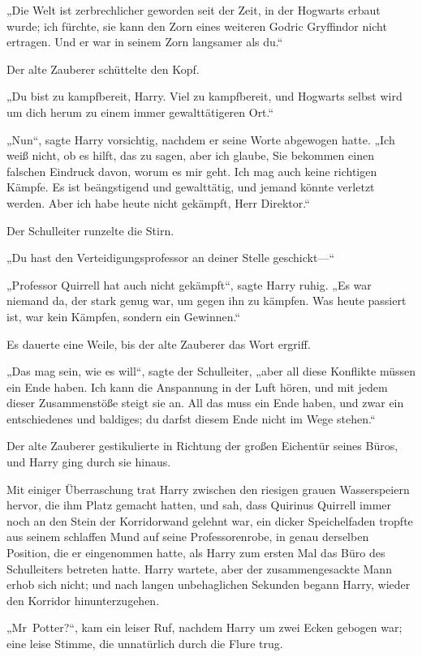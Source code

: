 {„Die Welt ist zerbrechlicher geworden seit der Zeit, in der Hogwarts erbaut wurde; ich fürchte, sie kann den Zorn eines weiteren Godric Gryffindor nicht ertragen. Und er war in seinem Zorn langsamer als du.“

Der alte Zauberer schüttelte den Kopf.

„Du bist zu kampfbereit, Harry. Viel zu kampfbereit, und Hogwarts selbst wird um dich herum zu einem immer gewalttätigeren Ort.“

„Nun“, sagte Harry vorsichtig, nachdem er seine Worte abgewogen hatte. „Ich weiß nicht, ob es hilft, das zu sagen, aber ich glaube, Sie bekommen einen falschen Eindruck davon, worum es mir geht. Ich mag auch keine richtigen Kämpfe. Es ist beängstigend und gewalttätig, und jemand könnte verletzt werden. Aber ich habe heute nicht gekämpft, Herr Direktor.“

Der Schulleiter runzelte die Stirn.

„Du hast den Verteidigungsprofessor an deiner Stelle geschickt—“

„Professor Quirrell hat auch nicht gekämpft“, sagte Harry ruhig. „Es war niemand da, der stark genug war, um gegen ihn zu kämpfen. Was heute passiert ist, war kein Kämpfen, sondern ein Gewinnen.“

Es dauerte eine Weile, bis der alte Zauberer das Wort ergriff.

„Das mag sein, wie es will“, sagte der Schulleiter, „aber all diese Konflikte müssen ein Ende haben. Ich kann die Anspannung in der Luft hören, und mit jedem dieser Zusammenstöße steigt sie an. All das muss ein Ende haben, und zwar ein entschiedenes und baldiges; du darfst diesem Ende nicht im Wege stehen.“

Der alte Zauberer gestikulierte in Richtung der großen Eichentür seines Büros, und Harry ging durch sie hinaus.

Mit einiger Überraschung trat Harry zwischen den riesigen grauen Wasserspeiern hervor, die ihm Platz gemacht hatten, und sah, dass Quirinus Quirrell immer noch an den Stein der Korridorwand gelehnt war, ein dicker Speichelfaden tropfte aus seinem schlaffen Mund auf seine Professorenrobe, in genau derselben Position, die er eingenommen hatte, als Harry zum ersten Mal das Büro des Schulleiters betreten hatte. Harry wartete, aber der zusammengesackte Mann erhob sich nicht; und nach langen unbehaglichen Sekunden begann Harry, wieder den Korridor hinunterzugehen.

„Mr~Potter?“, kam ein leiser Ruf, nachdem Harry um zwei Ecken gebogen war; eine leise Stimme, die unnatürlich durch die Flure trug.

}
